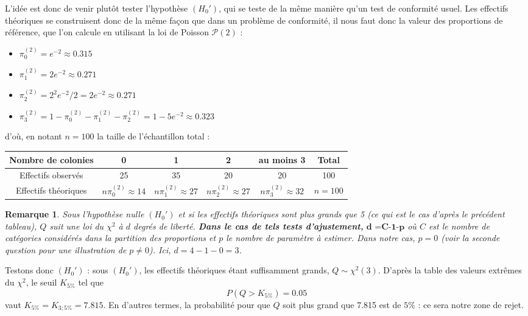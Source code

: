 \documentclass[a4paper,oneside,12pt]{article}
\theoremstyle{plain}
\newtheorem*{remark}{Remarque}
\begin{document}
\begin{enumerate}
    L'idée est donc de venir plutôt tester l'hypothèse $(H_0')$, qui se teste de la même manière qu'un test de conformité usuel. Les effectifs théoriques se construisent donc de la même façon que dans un problème de conformité, il nous faut donc la valeur des proportions de référence, que l'on calcule en utilisant la loi de Poisson $\mathcal{P}(2)$ :
    \begin{itemize}
        \item $\pi_0^{(2)} = e^{-2} \approx 0.315$
        \item $\pi_1^{(2)} = 2e^{-2} \approx 0.271$
        \item $\pi_2^{(2)} = 2^2e^{-2}/2 = 2e^{-2}  \approx 0.271$
        \item $\pi_3^{(2)} = 1 -\pi_0^{(2)} -\pi_1^{(2)} -\pi_2^{(2)} = 1- 5e^{-2} \approx 0.323$
    \end{itemize}
     d'où, en notant $n = 100$ la taille de l'échantillon total :
    \begin{table}[h]
    \centering
    \begin{tabular}{|c|c|c|c|c|c|}
        \hline
        Nombre de colonies & 0 & 1 & 2 & au moins 3 & Total \\
        \hline
        Effectifs observés & 25 & 35 & 20 & 20 & 100\\
        \hline
        Effectifs théoriques & $n\pi_0^{(2)} \approx 14$ & $n\pi_1^{(2)} \approx 27$ & $n\pi_2^{(2)} \approx 27$ & $n\pi_3^{(2)} \approx 32$ & $n=100$ \\
        \hline
    \end{tabular}
    \end{table}


    \begin{remark}
        Sous l'hypothèse nulle $(H_0')$ et si les effectifs théoriques sont plus grands que 5 (ce qui est le cas d'après le précédent tableau), $Q$ suit une loi du $\chi^2$ à $d$ degrés de liberté.\textbf{ Dans le cas de tels tests d'ajustement,} $\textbf{d =C-1-p}$ où $C$ est le nombre de catégories considérés dans la partition des proportions et $p$ le nombre de paramètre à estimer. Dans notre cas, $p=0$ (voir la seconde question pour une illustration de $p\neq 0$). Ici, $d =4-1-0 =3$.
    \end{remark}


    Testons donc $(H_0')$ : sous $(H_0')$, les effectifs théoriques étant suffisamment grands, $Q \sim \chi^2(3)$. D'après la table des valeurs extrêmes du $\chi^2$, le seuil $K_{5\%}$ tel que $$P(Q>K_{5\%}) = 0.05$$ vaut $K_{5\%}=K_{3;5\%} =7.815$. En d'autres termes, la probabilité pour que $Q$ soit plus grand que 7.815 est de $5\%$ : ce sera notre zone de rejet.


\end{enumerate}
\end{document}
